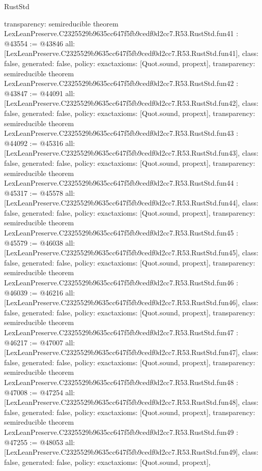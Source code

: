 \begin{lexlean}{RustStd}
\begin{coremodule}
{  transparency: semireducible
}
theorem LexLeanPreserve.C2325529b9635cc647f5fb9cedf0d2cc7.R53.RustStd.fun41 : @43554 := @43846 {
  all: [LexLeanPreserve.C2325529b9635cc647f5fb9cedf0d2cc7.R53.RustStd.fun41],
  class: false,
  generated: false,
  policy: exact{axioms: [Quot.sound, propext]},
  transparency: semireducible
}
theorem LexLeanPreserve.C2325529b9635cc647f5fb9cedf0d2cc7.R53.RustStd.fun42 : @43847 := @44091 {
  all: [LexLeanPreserve.C2325529b9635cc647f5fb9cedf0d2cc7.R53.RustStd.fun42],
  class: false,
  generated: false,
  policy: exact{axioms: [Quot.sound, propext]},
  transparency: semireducible
}
theorem LexLeanPreserve.C2325529b9635cc647f5fb9cedf0d2cc7.R53.RustStd.fun43 : @44092 := @45316 {
  all: [LexLeanPreserve.C2325529b9635cc647f5fb9cedf0d2cc7.R53.RustStd.fun43],
  class: false,
  generated: false,
  policy: exact{axioms: [Quot.sound, propext]},
  transparency: semireducible
}
theorem LexLeanPreserve.C2325529b9635cc647f5fb9cedf0d2cc7.R53.RustStd.fun44 : @45317 := @45578 {
  all: [LexLeanPreserve.C2325529b9635cc647f5fb9cedf0d2cc7.R53.RustStd.fun44],
  class: false,
  generated: false,
  policy: exact{axioms: [Quot.sound, propext]},
  transparency: semireducible
}
theorem LexLeanPreserve.C2325529b9635cc647f5fb9cedf0d2cc7.R53.RustStd.fun45 : @45579 := @46038 {
  all: [LexLeanPreserve.C2325529b9635cc647f5fb9cedf0d2cc7.R53.RustStd.fun45],
  class: false,
  generated: false,
  policy: exact{axioms: [Quot.sound, propext]},
  transparency: semireducible
}
theorem LexLeanPreserve.C2325529b9635cc647f5fb9cedf0d2cc7.R53.RustStd.fun46 : @46039 := @46216 {
  all: [LexLeanPreserve.C2325529b9635cc647f5fb9cedf0d2cc7.R53.RustStd.fun46],
  class: false,
  generated: false,
  policy: exact{axioms: [Quot.sound, propext]},
  transparency: semireducible
}
theorem LexLeanPreserve.C2325529b9635cc647f5fb9cedf0d2cc7.R53.RustStd.fun47 : @46217 := @47007 {
  all: [LexLeanPreserve.C2325529b9635cc647f5fb9cedf0d2cc7.R53.RustStd.fun47],
  class: false,
  generated: false,
  policy: exact{axioms: [Quot.sound, propext]},
  transparency: semireducible
}
theorem LexLeanPreserve.C2325529b9635cc647f5fb9cedf0d2cc7.R53.RustStd.fun48 : @47008 := @47254 {
  all: [LexLeanPreserve.C2325529b9635cc647f5fb9cedf0d2cc7.R53.RustStd.fun48],
  class: false,
  generated: false,
  policy: exact{axioms: [Quot.sound, propext]},
  transparency: semireducible
}
theorem LexLeanPreserve.C2325529b9635cc647f5fb9cedf0d2cc7.R53.RustStd.fun49 : @47255 := @48053 {
  all: [LexLeanPreserve.C2325529b9635cc647f5fb9cedf0d2cc7.R53.RustStd.fun49],
  class: false,
  generated: false,
  policy: exact{axioms: [Quot.sound, propext]},
}
\end{coremodule}
\end{lexlean}

